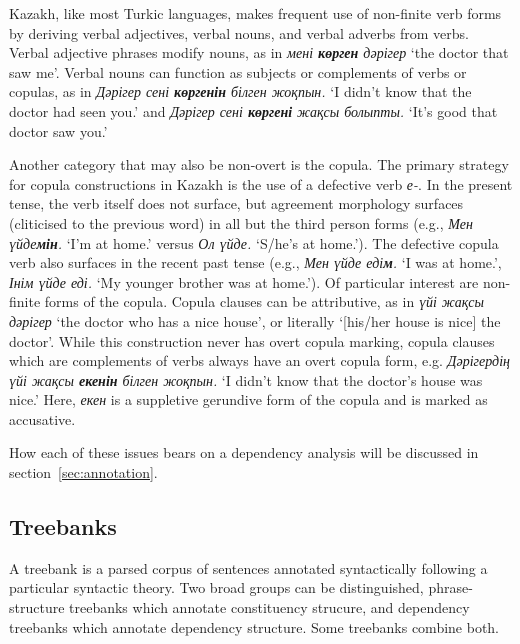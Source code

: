 \documentclass[a4paper,11pt, onecolumn,twoside]{article}
\newcommand{\kazakh}[1]{{\em #1}}
\newcommand{\gloss}[1]{`#1'}
\begin{document}
Kazakh, like most Turkic languages, makes frequent use of non-finite verb forms by deriving verbal adjectives, verbal nouns, and verbal adverbs from verbs.  Verbal adjective phrases modify nouns, as in \kazakh{мені \textbf{көрген} дәрігер} \gloss{the doctor that saw me}.  Verbal nouns can function as subjects or complements of verbs or copulas, as in \kazakh{Дәрігер сені \textbf{көргенін} білген жоқпын.} \gloss{I didn't know that the doctor had seen you.} and \kazakh{Дәрігер сені \textbf{көргені} жақсы болыпты.} \gloss{It's good that doctor saw you.}  

Another category that may also be non-overt is the copula.  The primary strategy for copula constructions in Kazakh is the use of a defective verb \kazakh{е-}.  In the present tense, the verb itself does not surface, but agreement morphology surfaces (cliticised to the previous word) in all but the third person forms (e.g., \kazakh{Мен үйде\textbf{мін}.} \gloss{I'm at home.} versus \kazakh{Ол үйде.} \gloss{S/he's at home.}).  The defective copula verb also surfaces in the recent past tense (e.g., \kazakh{Мен үйде еді\textbf{м}.} \gloss{I was at home.}, \kazakh{Інім үйде еді.} \gloss{My younger brother was at home.}).  Of particular interest are non-finite forms of the copula.  Copula clauses can be attributive, as in \kazakh{үйі жақсы дәрігер} \gloss{the doctor who has a nice house}, or literally \gloss{[his/her house is nice] the doctor}.  While this construction never has overt copula marking, copula clauses which are complements of verbs always have an overt copula form, e.g. \kazakh{Дәрігердің үйі жақсы \textbf{екенін} білген жоқпын.} \gloss{I didn't know that the doctor's house was nice.}  Here, \kazakh{екен} is a suppletive gerundive form of the copula and is marked as accusative.


How each of these issues bears on a dependency analysis will be discussed in section~\ref{sec:annotation}.


\subsection{Treebanks} %

A treebank is a parsed corpus of sentences annotated syntactically following a particular
syntactic theory. Two broad groups can be distinguished, phrase-structure treebanks
which annotate constituency strucure, and dependency treebanks which annotate dependency
structure. Some treebanks combine both.
\end{document}
